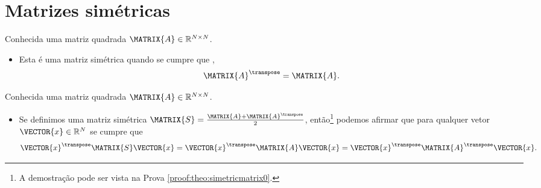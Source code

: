 \section{ Matrizes simétricas}


\begin{definition}\label{def:symmetricmatrix0}
Conhecida uma matriz quadrada $\MATRIX{A} \in \mathbb{R}^{N \times N}$. 
\begin{itemize}
\item Esta é uma matriz simétrica quando se cumpre que \cite[pp. 18]{golub2013matrix}, 
\begin{equation}
\MATRIX{A}^{\transpose} = \MATRIX{A}.
\end{equation}
\end{itemize}
\end{definition}

\begin{theorem}\label{theo:simetricmatrix0}
Conhecida uma matriz quadrada $\MATRIX{A} \in \mathbb{R}^{N \times N}$.
\begin{itemize}
\item Se definimos uma matriz simétrica $\MATRIX{S}=\frac{\MATRIX{A}+\MATRIX{A}^{\transpose}}{2}$, então\footnote{A
demostração pode ser vista na Prova \ref{proof:theo:simetricmatrix0}.} 
podemos afirmar que para qualquer vetor $\VECTOR{x} \in \mathbb{R}^{N}$ se cumpre que 
\begin{equation}
\VECTOR{x}^{\transpose}\MATRIX{S}\VECTOR{x} = 
\VECTOR{x}^{\transpose}\MATRIX{A}\VECTOR{x} =
\VECTOR{x}^{\transpose}\MATRIX{A}^{\transpose}\VECTOR{x}.
\end{equation}
\end{itemize}
\end{theorem}


